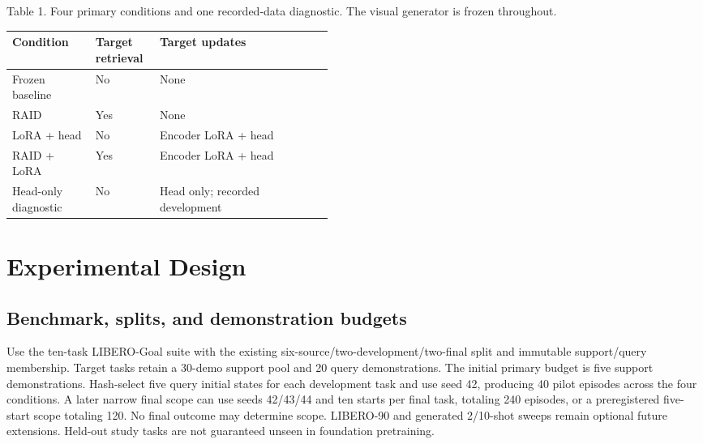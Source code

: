 \documentclass[11pt,a4paper]{article}
\begin{document}
Table 1. Four primary conditions and one recorded-data diagnostic. The visual generator is frozen throughout.

\begin{center}\small

\begin{tabularx}{\linewidth}{@{}>{\raggedright\arraybackslash}p{0.26\linewidth}>{\raggedright\arraybackslash}p{0.20\linewidth}X@{}}

\toprule

Condition & Target retrieval & Target updates \\

\midrule

Frozen baseline & No & None \\

RAID & Yes & None \\

LoRA + head & No & Encoder LoRA + head \\

RAID + LoRA & Yes & Encoder LoRA + head \\

Head-only diagnostic & No & Head only; recorded development \\

\bottomrule

\end{tabularx}

\end{center}

\section{Experimental Design}

\subsection{Benchmark, splits, and demonstration budgets}

Use the ten-task LIBERO-Goal suite with the existing six-source/two-development/two-final split and immutable support/query membership. Target tasks retain a 30-demo support pool and 20 query demonstrations. The initial primary budget is five support demonstrations. Hash-select five query initial states for each development task and use seed 42, producing 40 pilot episodes across the four conditions. A later narrow final scope can use seeds 42/43/44 and ten starts per final task, totaling 240 episodes, or a preregistered five-start scope totaling 120. No final outcome may determine scope. LIBERO-90 and generated 2/10-shot sweeps remain optional future extensions. Held-out study tasks are not guaranteed unseen in foundation pretraining.
\end{document}
